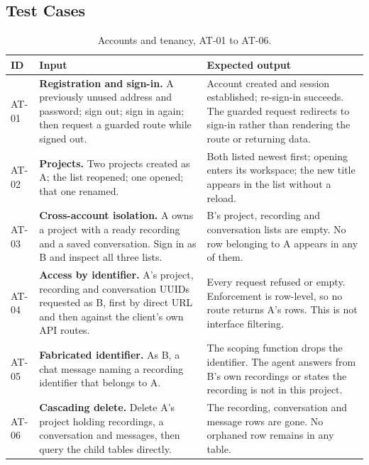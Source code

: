 \documentclass[11pt,a4paper]{article}
\begin{document}
\subsection{Test Cases}

\begin{table}[htbp]
\centering
\scriptsize
\begin{tabularx}{\textwidth}{@{}L{0.85cm}XX@{}}
\toprule
\textbf{ID} & \textbf{Input} & \textbf{Expected output} \\
\midrule
AT-01 & \textbf{Registration and sign-in.} A previously unused address and password; sign out; sign in again; then request a guarded route while signed out. & Account created and session established; re-sign-in succeeds. The guarded request redirects to sign-in rather than rendering the route or returning data. \\
AT-02 & \textbf{Projects.} Two projects created as A; the list reopened; one opened; that one renamed. & Both listed newest first; opening enters its workspace; the new title appears in the list without a reload. \\
AT-03 & \textbf{Cross-account isolation.} A owns a project with a ready recording and a saved conversation. Sign in as B and inspect all three lists. & B's project, recording and conversation lists are empty. No row belonging to A appears in any of them. \\
AT-04 & \textbf{Access by identifier.} A's project, recording and conversation UUIDs requested as B, first by direct URL and then against the client's own API routes. & Every request refused or empty. Enforcement is row-level, so no route returns A's rows. This is not interface filtering. \\
AT-05 & \textbf{Fabricated identifier.} As B, a chat message naming a recording identifier that belongs to A. & The scoping function drops the identifier. The agent answers from B's own recordings or states the recording is not in this project. \\
AT-06 & \textbf{Cascading delete.} Delete A's project holding recordings, a conversation and messages, then query the child tables directly. & The recording, conversation and message rows are gone. No orphaned row remains in any table. \\
\bottomrule
\end{tabularx}
\caption{Accounts and tenancy, AT-01 to AT-06.}
\end{table}
\end{document}
